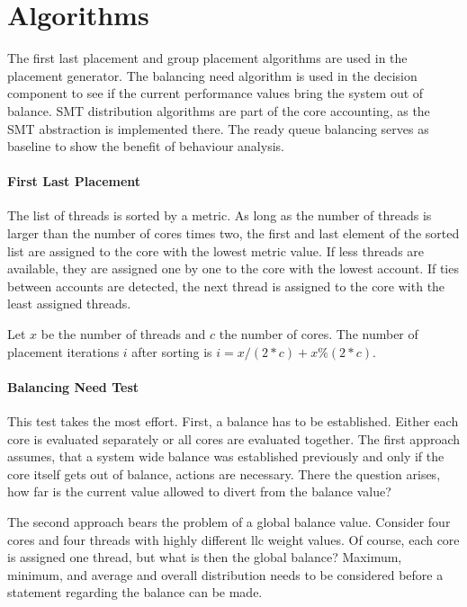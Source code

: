 \section{Algorithms}
\label{impl:algos}

The first last placement and group placement algorithms are used in the
placement generator.
The balancing need algorithm is used in the decision component to see if the
current performance values bring the system out of balance.
SMT distribution algorithms are part of the core accounting, as the SMT
abstraction is implemented there.
The ready queue balancing serves as baseline to show the benefit of behaviour
analysis.

\paragraph{First Last Placement}
The list of threads is sorted by a metric.
As long as the number of threads is larger than the number of cores times two,
the first and last element of the sorted list are assigned to the core with the
lowest metric value.
If less threads are available, they are assigned one by one to the core with
the lowest account.
If ties between accounts are detected, the next thread is assigned to the core
with the least assigned threads.

Let $x$ be the number of threads and $c$ the number of cores.
The number of placement iterations $i$ after sorting is
$i = x / (2*c) + x \% (2*c)$.

\paragraph{Balancing Need Test}
This test takes the most effort.
First, a balance has to be established.
Either each core is evaluated separately or all cores are evaluated together.
The first approach assumes, that a system wide balance was established
previously and only if the core itself gets out of balance, actions are
necessary.
There the question arises, how far is the current value allowed to divert from
the balance value?

The second approach bears the problem of a global balance value.
Consider four cores and four threads with highly different \gls{llc} weight
values.
Of course, each core is assigned one thread, but what is then the global
balance?
Maximum, minimum, and average and overall distribution needs to be considered
before a statement regarding the balance can be made.

